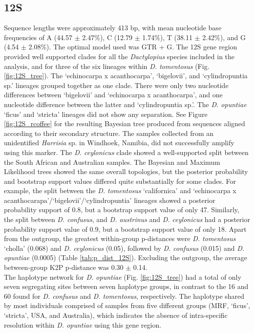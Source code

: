\subsection{12S}
Sequence lengths were approximately 413 bp, with mean nucleotide base frequencies of A (44.57 $\pm$ 2.47\%), C (12.79 $\pm$ 1.74\%), T (38.11 $\pm$ 2.42\%), and G (4.54 $\pm$ 2.08\%). The optimal model used was GTR + G.
The 12S gene region provided well supported clades for all the \textit{Dactylopius} species included in the analysis, and for three of the six lineages within \textit{D. tomentosus} (Fig. \ref{fig:12S_tree}). The `echinocarpa x acanthocarpa', `bigelovii', and `cylindropuntia sp.' lineages grouped together as one clade. There were only two nucleotide differences between `bigelovii' and `echinocarpa x acanthocarpa', and one nucleotide difference between the latter and `cylindropuntia sp.'. The \textit{D. opuntiae} `ficus' and `stricta' lineages did not show any separation. 
See Figure \ref{fig:12S_rcoffee} for the resulting Bayesian tree produced from sequences aligned according to their secondary structure.
The samples collected from an unidentified \textit{Harrisia} sp. in Windhoek, Namibia, did not successfully amplify using this marker. 
The \textit{D. ceylonicus} clade showed a well-supported split between the South African and Australian samples. 
The Bayesian and Maximum Likelihood trees showed the same overall topologies, but the posterior probability and bootstrap support values differed quite substantially for some clades. For example, the split between the \textit{D. tomentosus} `californica' and `echinocarpa x acanthocarapa'/`bigelovii'/`cylindropuntia' lineages showed a posterior probability support of 0.8, but a bootstrap support value of only 47. Similarly, the split between \textit{D. confusus}, and \textit{D. austrinus} and \textit{D. ceylonicus} had a posterior probability support value of 0.9, but a bootstrap support value of only 18.
Apart from the outgroup, the greatest within-group p-distances were \textit{D. tomentosus} `cholla' (0.068) and \textit{D. ceylonicus} (0.05), followed by \textit{D. confusus} (0.015) and \textit{D. opuntiae} (0.0005) (Table \ref{tab:p_dist_12S}). Excluding the outgroup, the average between-group K2P p-distance was 0.30 $\pm$ 0.14. \\
The haplotype network for \textit{D. opuntiae} (Fig. \ref{fig:12S_tree}) had a total of only seven segregating sites between seven haplotype groups, in contrast to the 16 and 60 found for \textit{D. confusus} and \textit{D. tomentosus}, respectively. 
The haplotype shared by most individuals comprised of samples from five different groups (MRF, `ficus', `stricta', USA, and Australia), which indicates the absence of intra-specific resolution within \textit{D. opuntiae} using this gene region. 

